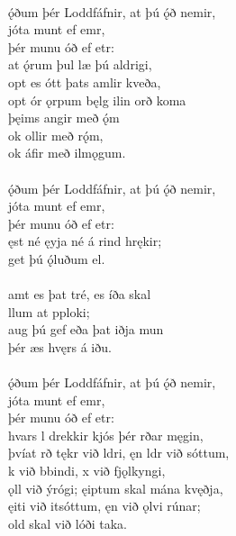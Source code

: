  \\

\bva {}ǫ́ðum þér Loddfáfnir, \hld at þú ǫ́ð nemir, \\%
\ind {}jóta munt ef emr, \\%
\ind þér munu óð ef etr: \\%
at ǫ́rum þul \hld {}læ þú aldrigi, \\%
\ind opt es ótt þats amlir kveða, \\%
opt ór ǫrpum bęlg \hld {}ilin orð koma \\%
\ind þęims angir með ǫ́m \\%
\ind ok ollir með rǫ́m, \\%
\ind ok áfir með ilmǫgum.\\%

 \\

\bva {}ǫ́ðum þér Loddfáfnir, \hld at þú ǫ́ð nemir, \\%
\ind {}jóta munt ef emr, \\%
\ind þér munu óð ef etr: \\%
ęst né ęyja \hld né á rind hrękir; \\%
\ind get þú ǫ́luðum el.\\%

 \\

\bva {}amt es þat tré, \hld es íða skal \\%
\ind {}llum at pploki; \\%
aug þú gef \hld eða þat iðja mun \\%
\ind þér æs hvęrs á iðu.\\%

 \\

\bva {}ǫ́ðum þér Loddfáfnir, \hld at þú ǫ́ð nemir, \\%
\ind {}jóta munt ef emr, \\%
\ind þér munu óð ef etr: \\%
hvars l drekkir \hld kjós þér rðar męgin, \\%
þvíat rð tękr við ldri, \hld ęn ldr við sóttum, \\%
k við bbindi, \hld {}x við fjǫlkyngi, \\%
ǫll við ýrógi; \hld {}ęiptum skal mána kvęðja, \\%
ęiti við itsóttum, \hld ęn við ǫlvi rúnar; \\%
\ind {}old skal við lóði taka.\\%

